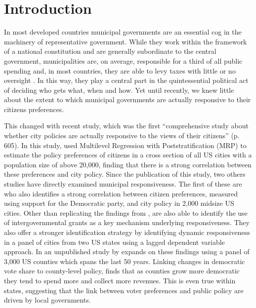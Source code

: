 \documentclass[a4paper,12pt]{article}
\begin{document}
	\bigskip
	
	
	
\section{Introduction}

In most developed countries municipal governments are an essential cog in the machinery of representative government. While they work within the framework of a national constitution and are generally subordinate to the central government, municipalities are, on average, responsible for a third of all public spending and, in most countries, they are able to levy taxes with little or no oversight \cite{oecd2016subnational}. In this way, they play a central part in the quintessential political act of deciding who gets what, when and how.  Yet until recently, we knew little about the extent to which municipal governments are actually responsive to their citizens preferences.


This changed with \cite{tausanovitch2014representation} recent study, which  was the first ``comprehensive study about whether city policies are actually responsive to the views of their citizens'' (p. 605). In this study, \citeauthor{tausanovitch2014representation} used Multilevel Regression with Poststratification (MRP) to estimate the policy preferences of citizens in a cross section of all US cities with a population size of above 20,000, finding that there is a strong correlation between these preferences and city policy. Since the publication of this study, two others studies have directly examined municipal responsiveness. The first of these are \cite{einstein2016pushing} who also identifies a strong correlation between citizen preferences, measured using support for the Democratic party,  and city policy in 2,000 midsize US cities. Other than replicating the findings from \cite{tausanovitch2014representation}, \citeauthor{einstein2016pushing} are also able to identify the use of intergovernmental grants as a key mechanism underlying responsiveness. They also offer a stronger identification strategy by identifying dynamic responsiveness \citep[][cf.]{stimson1995dynamic} in a panel of cities from two US states using a lagged dependent variable approach. In an unpublished study by \cite{sances2017voters} expands on these findings using a panel of 3,000 US counties which spans the last 50 years. Linking changes in democratic vote share to county-level policy, \citeauthor{sances2017voters} finds that as counties grow more democratic they tend to spend more and collect more revenues. This is even true within states, suggesting that the link between voter preferences and public policy are driven by local governments.
\end{document}
